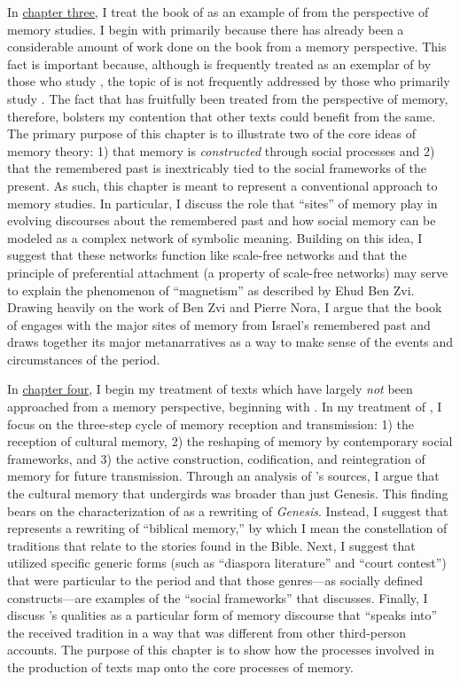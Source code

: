 In \hyperref[chap:chronicles]{chapter three}, I treat the book of \chronicles as an example of \rwb from the perspective of memory studies. I begin with \chronicles primarily because there has already been a considerable amount of work done on the book from a memory perspective. This fact is important because, although \chronicles is frequently treated as an exemplar of \rwb by those who study \rwb, the topic of \rwb is not frequently addressed by those who primarily study \chronicles. The fact that \chronicles has fruitfully been treated from the perspective of memory, therefore, bolsters my contention that other \rwb texts could benefit from the same. The primary purpose of this chapter is to illustrate two of the core ideas of memory theory: 1) that memory is \emph{constructed} through social processes and 2) that the remembered past is inextricably tied to the social frameworks of the present.  As such, this chapter is meant to represent a conventional approach to memory studies. In particular, I discuss the role that ``sites'' of memory play in evolving discourses about the remembered past and how social memory can be modeled as a complex network of symbolic meaning. Building on this idea, I suggest that these networks function like scale-free networks and that the principle of preferential attachment (a property of scale-free networks) may serve to explain the phenomenon of ``magnetism'' as described by Ehud Ben Zvi. Drawing heavily on the work of Ben Zvi and Pierre Nora, I argue that the book of \chronicles engages with the major sites of memory from Israel's remembered past and draws together its major metanarratives as a way to make sense of the events and circumstances of the \secondtemple period.

In \hyperref[chap:ga]{chapter four}, I begin my treatment of \rwb texts which have largely \emph{not} been approached from a memory perspective, beginning with \ga. In my treatment of \ga, I focus on the three-step cycle of memory reception and transmission: 1) the reception of cultural memory, 2) the reshaping of memory by contemporary social frameworks, and 3) the active construction, codification, and reintegration of memory for future transmission. Through an analysis of \ga's sources, I argue that the cultural memory that undergirds \ga was broader than just Genesis. This finding bears on the characterization of \ga as a rewriting of \emph{Genesis}. Instead, I suggest that \ga represents a rewriting of ``biblical memory,'' by which I mean the constellation of traditions that relate to the stories found in the Bible. Next, I suggest that \ga utilized specific generic forms (such as ``diaspora literature'' and ``court contest'') that were particular to the \secondtemple period and that those genres---as socially defined constructs---are examples of the ``social frameworks'' that \halbwachs discusses. Finally, I discuss \ga's \psgraphical qualities as a particular form of memory discourse that ``speaks into'' the received tradition in a way that was different from other third-person accounts. The purpose of this chapter is to show how the processes involved in the production of \rwb texts map onto the core processes of memory.

